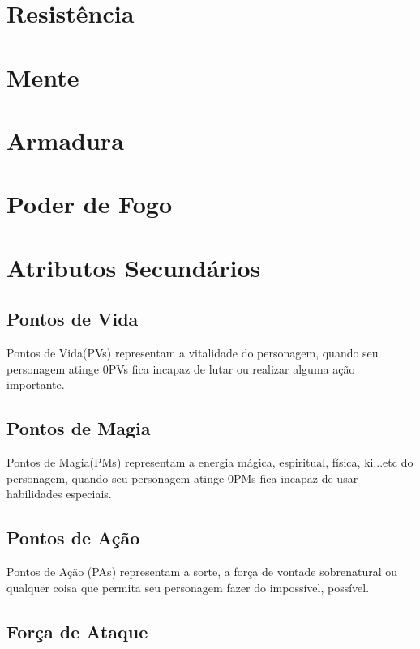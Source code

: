 \section{Resistência}

\section{Mente}

\section{Armadura}

\section{Poder de Fogo}

\section{Atributos Secundários}

\subsection{Pontos de Vida}

Pontos de Vida(PVs) representam a vitalidade do personagem, quando seu personagem atinge 0PVs fica incapaz de lutar ou realizar alguma ação importante.

\subsection{Pontos de Magia}

Pontos de Magia(PMs) representam a energia mágica, espiritual, física, ki...etc do personagem, quando seu personagem atinge 0PMs fica incapaz de usar habilidades especiais.

\subsection{Pontos de Ação}

Pontos de Ação (PAs) representam a sorte, a força de vontade sobrenatural ou qualquer coisa que permita seu personagem fazer do impossível, possível.

\subsection{Força de Ataque}

